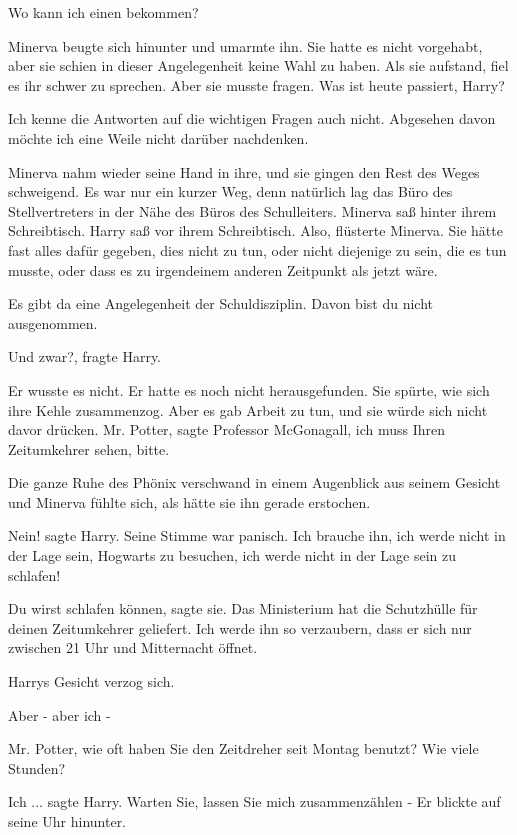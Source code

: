 \glqq{}Wo kann ich einen bekommen?\grqq{}

Minerva beugte sich hinunter und umarmte ihn. Sie hatte es nicht vorgehabt, aber
sie schien in dieser Angelegenheit keine Wahl zu haben. Als sie aufstand, fiel
es ihr schwer zu sprechen. Aber sie musste fragen. \glqq{}Was ist heute passiert,
Harry?\grqq{}

\glqq{}Ich kenne die Antworten auf die wichtigen Fragen auch nicht. Abgesehen
davon möchte ich eine Weile nicht darüber nachdenken.\grqq{}

Minerva nahm wieder seine Hand in ihre, und sie gingen den Rest des Weges
schweigend. Es war nur ein kurzer Weg, denn natürlich lag das Büro des
Stellvertreters in der Nähe des Büros des Schulleiters. Minerva saß hinter ihrem
Schreibtisch. Harry saß vor ihrem Schreibtisch. \glqq{}Also\grqq{}, flüsterte
Minerva. Sie hätte fast alles dafür gegeben, dies nicht zu tun, oder nicht
diejenige zu sein, die es tun musste, oder dass es zu irgendeinem anderen
Zeitpunkt als jetzt wäre.

\glqq{}Es gibt da eine Angelegenheit der Schuldisziplin. Davon bist du nicht
ausgenommen.\grqq{}

\glqq{}Und zwar?\grqq{}, fragte Harry.

Er wusste es nicht. Er hatte es noch nicht herausgefunden. Sie spürte, wie sich
ihre Kehle zusammenzog. Aber es gab Arbeit zu tun, und sie würde sich nicht
davor drücken. \glqq{}Mr. Potter\grqq{}, sagte Professor McGonagall, \glqq{}ich
muss Ihren Zeitumkehrer sehen, bitte.\grqq{}

Die ganze Ruhe des Phönix verschwand in einem Augenblick aus seinem Gesicht und
Minerva fühlte sich, als hätte sie ihn gerade erstochen.

\glqq{}Nein!\grqq{} sagte Harry. Seine Stimme war panisch. \glqq{}Ich brauche ihn,
ich werde nicht in der Lage sein, Hogwarts zu besuchen, ich werde nicht in der
Lage sein zu schlafen!\grqq{}

\glqq{}Du wirst schlafen können\grqq{}, sagte sie. \glqq{}Das Ministerium hat die
Schutzhülle für deinen Zeitumkehrer geliefert. Ich werde ihn so verzaubern, dass
er sich nur zwischen 21 Uhr und Mitternacht öffnet.\grqq{}

Harrys Gesicht verzog sich.

\glqq{}Aber - aber ich -\grqq{}

\glqq{}Mr. Potter, wie oft haben Sie den Zeitdreher seit Montag benutzt? Wie
viele Stunden?\grqq{}

\glqq{}Ich ...\grqq{} sagte Harry. \glqq{}Warten Sie, lassen Sie mich
zusammenzählen -\grqq{} Er blickte auf seine Uhr hinunter.

